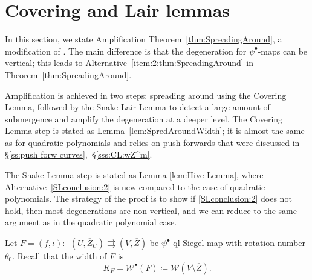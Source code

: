 \documentclass{amsart}
\renewcommand{\sp}{{\ \ }}
\newcommand{\1}{{\mathbb 1 }}
\newcommand{\Width}{{\mathcal W}}
\theoremstyle{remark}
\numberwithin{equation}{section}
\theoremstyle{definition}
\begin{document}
\section{Covering and Lair lemmas}\label{sss:AppC:proof:Sect8} 

In this section, we state Amplification Theorem~\ref{thm:SpreadingAround}, a modification of \cite[Amplification Theorem 8.1]{DL22}. The main difference is that the degeneration for $\psi^\bullet$-maps can be vertical; this leads to Alternative~\ref{item:2:thm:SpreadingAround} in Theorem~\ref{thm:SpreadingAround}.

Amplification is achieved in two steps: spreading around using the Covering Lemma, followed by the Snake-Lair Lemma to detect a large amount of submergence and amplify the degeneration at a deeper level. The Covering Lemma step is stated as Lemma~\ref{lem:SpredAroundWidth}; it is almost the same as for quadratic polynomials and relies on push-forwards that were discussed in \S\ref{ss:push forw curves},~\S\ref{sss:CL:wZ^m}.

The Snake Lemma step is stated as Lemma \ref{lem:Hive Lemma}, where  Alternative~\ref{SLconclusion:2} is new compared to the case of quadratic polynomials. The strategy of the proof is to show if \ref{SLconclusion:2} does not hold, then most degenerations are non-vertical, and we can reduce to the same argument as in the quadratic polynomial case.


Let $F=(f,\iota)\colon \sp ( U, \overline Z_U)  \rightrightarrows (V, \overline Z )$ be $\psi^\bullet$-ql Siegel map with rotation number $\theta_0$.
Recall that the width of $F$ is 
$$
K_F = \Width^\bullet(F)\coloneqq \Width(V\setminus \overline Z).
$$
\end{document}
